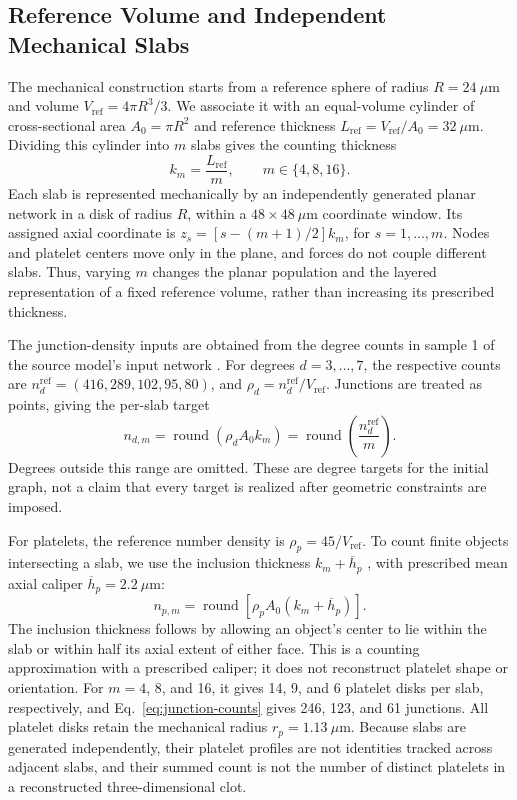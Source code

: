 \documentclass[twocolumn, 10pt]{article}
\begin{document}
\subsection{Reference Volume and Independent Mechanical Slabs}
The mechanical construction starts from a reference sphere of radius $R=24~\mu\mathrm m$ and volume $V_{\mathrm{ref}}=4\pi R^3/3$. We associate it with an equal-volume cylinder of cross-sectional area $A_0=\pi R^2$ and reference thickness $L_{\mathrm{ref}}=V_{\mathrm{ref}}/A_0=32~\mu\mathrm m$. Dividing this cylinder into $m$ slabs gives the counting thickness
\begin{equation}
k_m=\frac{L_{\mathrm{ref}}}{m},\qquad m\in\{4,8,16\}.
\label{eq:slab-thickness}
\end{equation}
Each slab is represented mechanically by an independently generated planar network in a disk of radius $R$, within a $48\times48~\mu\mathrm m$ coordinate window. Its assigned axial coordinate is $z_s=[s-(m+1)/2]k_m$, for $s=1,\ldots,m$. Nodes and platelet centers move only in the plane, and forces do not couple different slabs. Thus, varying $m$ changes the planar population and the layered representation of a fixed reference volume, rather than increasing its prescribed thickness.

The junction-density inputs are obtained from the degree counts in sample 1 of the source model's input network \cite{MichaelCodeOcean2023}. For degrees $d=3,\ldots,7$, the respective counts are $n_d^{\mathrm{ref}}=(416,289,102,95,80)$, and $\rho_d=n_d^{\mathrm{ref}}/V_{\mathrm{ref}}$. Junctions are treated as points, giving the per-slab target
\begin{equation}
n_{d,m}=\operatorname{round}(\rho_d A_0 k_m)
=\operatorname{round}\!\left(\frac{n_d^{\mathrm{ref}}}{m}\right).
\label{eq:junction-counts}
\end{equation}
Degrees outside this range are omitted. These are degree targets for the initial graph, not a claim that every target is realized after geometric constraints are imposed.

For platelets, the reference number density is $\rho_p=45/V_{\mathrm{ref}}$. To count finite objects intersecting a slab, we use the inclusion thickness $k_m+\overline h_p$ \cite{BaddeleyJensen2005}, with prescribed mean axial caliper $\overline h_p=2.2~\mu\mathrm m$:
\begin{equation}
n_{p,m}=\operatorname{round}\!\left[\rho_p A_0(k_m+\overline h_p)\right].
\label{eq:platelet-slab-count}
\end{equation}
The inclusion thickness follows by allowing an object's center to lie within the slab or within half its axial extent of either face. This is a counting approximation with a prescribed caliper; it does not reconstruct platelet shape or orientation. For $m=4$, 8, and 16, it gives 14, 9, and 6 platelet disks per slab, respectively, and Eq.~\eqref{eq:junction-counts} gives 246, 123, and 61 junctions. All platelet disks retain the mechanical radius $r_p=1.13~\mu\mathrm m$. Because slabs are generated independently, their platelet profiles are not identities tracked across adjacent slabs, and their summed count is not the number of distinct platelets in a reconstructed three-dimensional clot.
\end{document}
